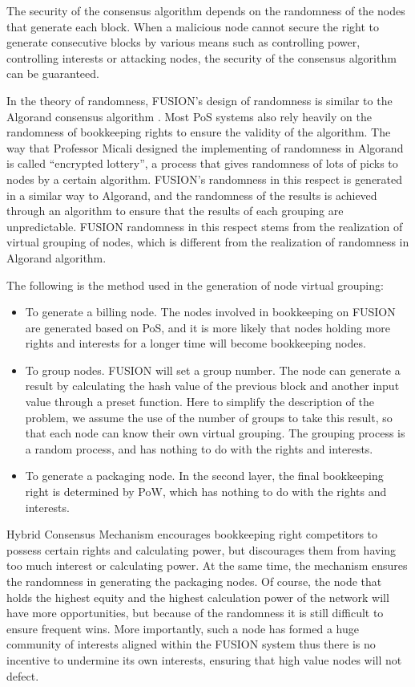 \documentclass[a4paper,12pt]{article}
\begin{document}
The security of the consensus algorithm depends on the randomness of the nodes that generate each block. When a malicious node cannot secure the right to generate consecutive blocks by various means such as controlling power, controlling interests or attacking nodes, the security of the consensus algorithm can be guaranteed.

In the theory of randomness, FUSION's design of randomness is similar to the Algorand consensus algorithm \citep {Jing2017}. Most PoS systems also rely heavily on the randomness of bookkeeping rights to ensure the validity of the algorithm. The way that Professor Micali designed the implementing of randomness in Algorand is called “encrypted lottery”, a process that gives randomness of lots of picks to nodes by a certain algorithm. FUSION's randomness in this respect is generated in a similar way to Algorand, and the randomness of the results is achieved through an algorithm to ensure that the results of each grouping are unpredictable. FUSION randomness in this respect stems from the realization of virtual grouping of nodes, which is different from the realization of randomness in Algorand algorithm.

The following is the method used in the generation of node virtual grouping:

\begin {itemize} [itemindent = 1em]
\item To generate a billing node. The nodes involved in bookkeeping on FUSION are generated based on PoS, and it is more likely that nodes holding more rights and interests for a longer time will become bookkeeping nodes.
\item To group nodes. FUSION will set a group number. The node can generate a result by calculating the hash value of the previous block and another input value through a preset function. Here to simplify the description of the problem, we assume the use of the number of groups to take this result, so that each node can know their own virtual grouping. The grouping process is a random process, and has nothing to do with the rights and interests.
\item To generate a packaging node. In the second layer, the final bookkeeping right is determined by PoW, which has nothing to do with the rights and interests.
\end {itemize}

Hybrid Consensus Mechanism encourages bookkeeping right competitors to possess certain rights and calculating power, but discourages them from having too much interest or calculating power. At the same time, the mechanism ensures the randomness in generating the packaging nodes. Of course, the node that holds the highest equity and the highest calculation power of the network will have more opportunities, but because of the randomness it is still difficult to ensure frequent wins. More importantly, such a node has formed a huge community of interests aligned within the FUSION system thus there is no incentive to undermine its own interests, ensuring that high value nodes will not defect.
\end{document}
